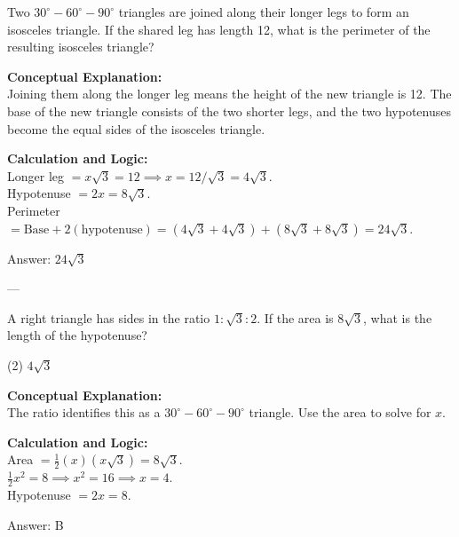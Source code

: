 \documentclass[11pt,paper=a4,answers]{exam}
\begin{document}
\begin{questions}
\question
Two $30^\circ-60^\circ-90^\circ$ triangles are joined along their longer legs to form an isosceles triangle. If the shared leg has length 12, what is the perimeter of the resulting isosceles triangle?

\begin{solution}
\textbf{Conceptual Explanation:} \\
Joining them along the longer leg means the height of the new triangle is 12. The base of the new triangle consists of the two shorter legs, and the two hypotenuses become the equal sides of the isosceles triangle.

\vspace{10pt}
\textbf{Calculation and Logic:} \\
Longer leg $= x\sqrt{3} = 12 \implies x = 12/\sqrt{3} = 4\sqrt{3}$. \\
Hypotenuse $= 2x = 8\sqrt{3}$. \\
Perimeter $= \text{Base} + 2(\text{hypotenuse}) = (4\sqrt{3} + 4\sqrt{3}) + (8\sqrt{3} + 8\sqrt{3}) = 24\sqrt{3}$.

\vspace{15pt}
Answer: \colorbox{yellow!100}{$24\sqrt{3}$}
\end{solution}

---

\question
A right triangle has sides in the ratio $1 : \sqrt{3} : 2$. If the area is $8\sqrt{3}$, what is the length of the hypotenuse?
\begin{tasks}(2)
    \task $4\sqrt{3}$
\end{tasks}

\begin{solution}
\textbf{Conceptual Explanation:} \\
The ratio identifies this as a $30^\circ-60^\circ-90^\circ$ triangle. Use the area to solve for $x$.

\vspace{10pt}
\textbf{Calculation and Logic:} \\
Area $= \frac{1}{2}(x)(x\sqrt{3}) = 8\sqrt{3}$. \\
$\frac{1}{2}x^2 = 8 \implies x^2 = 16 \implies x = 4$. \\
Hypotenuse $= 2x = 8$.

\vspace{15pt}
Answer: \colorbox{yellow!100}{B}
\end{solution}


\end{questions}
\end{document}
